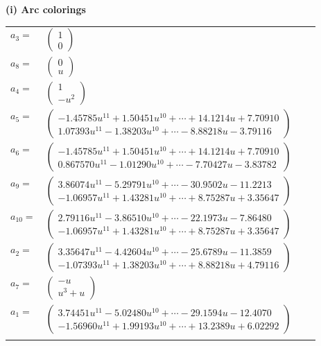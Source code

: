 \documentclass[1p]{elsarticle_modified}
\theoremstyle{definition}
\begin{document}
\flushleft \textbf{(i) Arc colorings}\\
\begin{tabular}{m{7pt} m{180pt} m{7pt} m{180pt} }
\flushright $a_{3}=$&$\begin{pmatrix}1\\0\end{pmatrix}$ \\
\flushright $a_{8}=$&$\begin{pmatrix}0\\u\end{pmatrix}$ \\
\flushright $a_{4}=$&$\begin{pmatrix}1\\- u^2\end{pmatrix}$ \\
\flushright $a_{5}=$&$\begin{pmatrix}-1.45785 u^{11}+1.50451 u^{10}+\cdots+14.1214 u+7.70910\\1.07393 u^{11}-1.38203 u^{10}+\cdots-8.88218 u-3.79116\end{pmatrix}$ \\
\flushright $a_{6}=$&$\begin{pmatrix}-1.45785 u^{11}+1.50451 u^{10}+\cdots+14.1214 u+7.70910\\0.867570 u^{11}-1.01290 u^{10}+\cdots-7.70427 u-3.83782\end{pmatrix}$ \\
\flushright $a_{9}=$&$\begin{pmatrix}3.86074 u^{11}-5.29791 u^{10}+\cdots-30.9502 u-11.2213\\-1.06957 u^{11}+1.43281 u^{10}+\cdots+8.75287 u+3.35647\end{pmatrix}$ \\
\flushright $a_{10}=$&$\begin{pmatrix}2.79116 u^{11}-3.86510 u^{10}+\cdots-22.1973 u-7.86480\\-1.06957 u^{11}+1.43281 u^{10}+\cdots+8.75287 u+3.35647\end{pmatrix}$ \\
\flushright $a_{2}=$&$\begin{pmatrix}3.35647 u^{11}-4.42604 u^{10}+\cdots-25.6789 u-11.3859\\-1.07393 u^{11}+1.38203 u^{10}+\cdots+8.88218 u+4.79116\end{pmatrix}$ \\
\flushright $a_{7}=$&$\begin{pmatrix}- u\\u^3+u\end{pmatrix}$ \\
\flushright $a_{1}=$&$\begin{pmatrix}3.74451 u^{11}-5.02480 u^{10}+\cdots-29.1594 u-12.4070\\-1.56960 u^{11}+1.99193 u^{10}+\cdots+13.2389 u+6.02292\end{pmatrix}$\\&\end{tabular}
\end{document}
